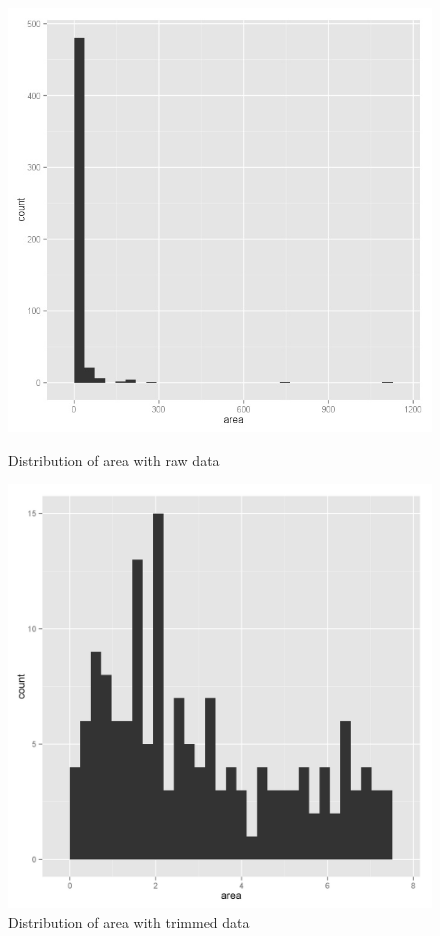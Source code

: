 \documentclass{article}
\begin{document}
\begin{figure}
  \begin{minipage}[b]{0.45\linewidth}
  \centering
  \includegraphics[width=\textwidth]{badhist.jpg}
  \caption{Distribution of area with raw data}
\end{minipage}
\hspace{0.5cm}
  \begin{minipage}[b]{0.45\linewidth}
  \centering
  \includegraphics[width=\textwidth]{goodhist.jpg}
  \caption{Distribution of area with trimmed data}
\end{minipage}
\end{figure}
\end{document}
